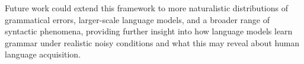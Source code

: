 Future work could extend this framework to more naturalistic distributions of grammatical errors, larger-scale language models, and a broader range of syntactic phenomena, providing further insight into how language models learn grammar under realistic noisy conditions and what this may reveal about human language acquisition.

